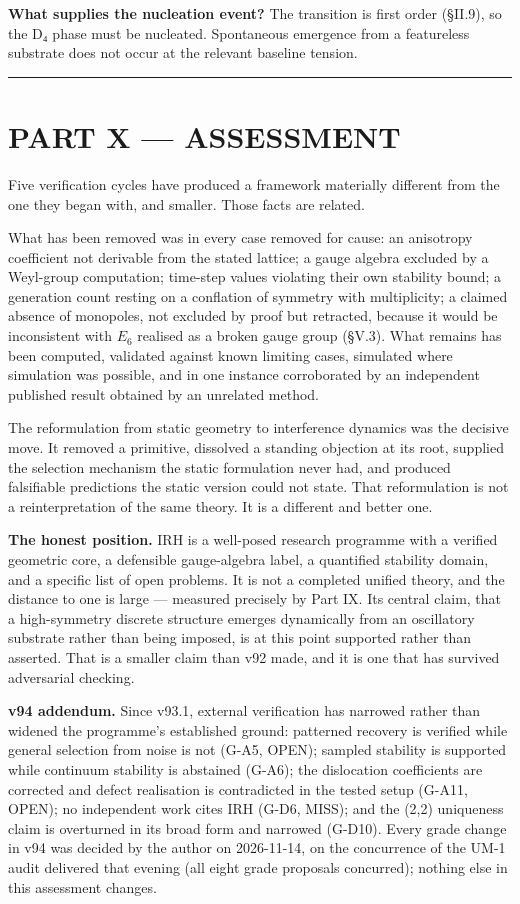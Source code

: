 \documentclass[a4paper,11pt]{article}
\begin{document}
\textbf{What supplies the nucleation event?} The transition is first order (§II.9), so the D₄ phase must be nucleated. Spontaneous emergence from a featureless substrate does not occur at the relevant baseline tension.

\medskip\hrule\medskip

\section*{PART X — ASSESSMENT}

Five verification cycles have produced a framework materially different from the one they began with, and smaller. Those facts are related.

What has been removed was in every case removed for cause: an anisotropy coefficient not derivable from the stated lattice; a gauge algebra excluded by a Weyl-group computation; time-step values violating their own stability bound; a generation count resting on a conflation of symmetry with multiplicity; a claimed absence of monopoles, not excluded by proof but retracted, because it would be inconsistent with $E_6$ realised as a broken gauge group (§V.3). What remains has been computed, validated against known limiting cases, simulated where simulation was possible, and in one instance corroborated by an independent published result obtained by an unrelated method.

The reformulation from static geometry to interference dynamics was the decisive move. It removed a primitive, dissolved a standing objection at its root, supplied the selection mechanism the static formulation never had, and produced falsifiable predictions the static version could not state. That reformulation is not a reinterpretation of the same theory. It is a different and better one.

\textbf{The honest position.} IRH is a well-posed research programme with a verified geometric core, a defensible gauge-algebra label, a quantified stability domain, and a specific list of open problems. It is not a completed unified theory, and the distance to one is large — measured precisely by Part IX. Its central claim, that a high-symmetry discrete structure emerges dynamically from an oscillatory substrate rather than being imposed, is at this point supported rather than asserted. That is a smaller claim than v92 made, and it is one that has survived adversarial checking.

\textbf{v94 addendum.} Since v93.1, external verification has narrowed rather than widened the programme's established ground: patterned recovery is verified while general selection from noise is not (G-A5, OPEN); sampled stability is supported while continuum stability is abstained (G-A6); the dislocation coefficients are corrected and defect realisation is contradicted in the tested setup (G-A11, OPEN); no independent work cites IRH (G-D6, MISS); and the (2,2) uniqueness claim is overturned in its broad form and narrowed (G-D10). Every grade change in v94 was decided by the author on 2026-11-14, on the concurrence of the UM-1 audit delivered that evening (all eight grade proposals concurred); nothing else in this assessment changes.
\end{document}

